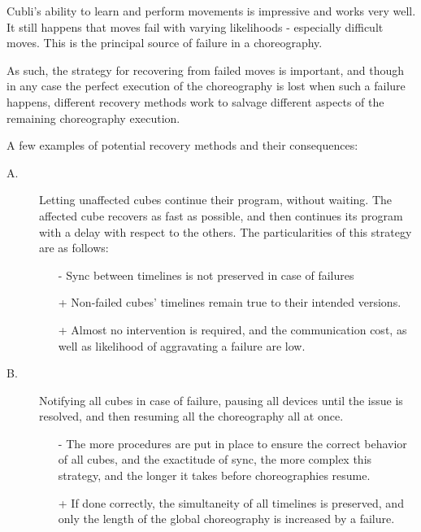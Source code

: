 Cubli's ability to learn and perform movements is impressive and works very well. It still happens that moves fail with varying likelihoods - especially difficult moves. This is the principal source of failure in a choreography.

As such, the strategy for recovering from failed moves is important, and though in any case the perfect execution of the choreography is lost when such a failure happens, different recovery methods work to salvage different aspects of the remaining choreography execution.

A few examples of potential recovery methods and their consequences:\\

\begin{description}
\item[A.] Letting unaffected cubes continue their program, without waiting. The affected cube recovers as fast as possible, and then continues its program with a delay with respect to the others.
The particularities of this strategy are as follows:

\begin{itemize}
\item[-] Sync between timelines is not preserved in case of failures
\item[+] Non-failed cubes' timelines remain true to their intended versions.
\item[+] Almost no intervention is required, and the communication cost, as well as likelihood of aggravating a failure are low.
\end{itemize}

\item[B.] Notifying all cubes in case of failure, pausing all devices until the issue is resolved, and then resuming all the choreography all at once.

\begin{itemize}
\item[-] The more procedures are put in place to ensure the correct behavior of all cubes, and the exactitude of sync, the more complex this strategy, and the longer it takes before choreographies resume. 
\item[+] If done correctly, the simultaneity of all timelines is preserved, and only the length of the global choreography is increased by a failure.
\end{itemize}

\end{description}
